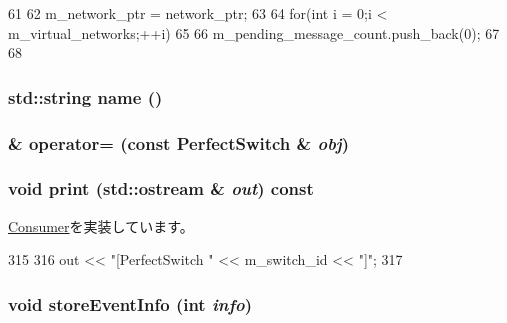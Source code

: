 \begin{DoxyCode}
61 {
62     m_network_ptr = network_ptr;
63 
64     for(int i = 0;i < m_virtual_networks;++i)
65     {
66         m_pending_message_count.push_back(0);
67     }
68 }
\end{DoxyCode}
\hypertarget{classPerfectSwitch_af1801e31af6399bccce114ab12575168}{
\subsubsection[{name}]{\setlength{\rightskip}{0pt plus 5cm}std::string name ()}}
\label{classPerfectSwitch_af1801e31af6399bccce114ab12575168}



\hypertarget{classPerfectSwitch_ab37620fb3c7a42bfae3ac244e4f3c3ac}{
\subsubsection[{operator=}]{\& operator= (const {\bf PerfectSwitch} \& {\em obj})}}
\label{classPerfectSwitch_ab37620fb3c7a42bfae3ac244e4f3c3ac}
\hypertarget{classPerfectSwitch_ac55fe386a101fbae38c716067c9966a0}{
\subsubsection[{print}]{\setlength{\rightskip}{0pt plus 5cm}void print (std::ostream \& {\em out}) const}}
\label{classPerfectSwitch_ac55fe386a101fbae38c716067c9966a0}


\hyperlink{classConsumer_a3ea5f7af5db62cc24f4e40df9ea5c971}{Consumer}を実装しています。


\begin{DoxyCode}
315 {
316     out << "[PerfectSwitch " << m_switch_id << "]";
317 }
\end{DoxyCode}
\hypertarget{classPerfectSwitch_accd0665763c9caa446789b27a62f931b}{
\subsubsection[{storeEventInfo}]{\setlength{\rightskip}{0pt plus 5cm}void storeEventInfo (int {\em info})}}
\label{classPerfectSwitch_accd0665763c9caa446789b27a62f931b}


